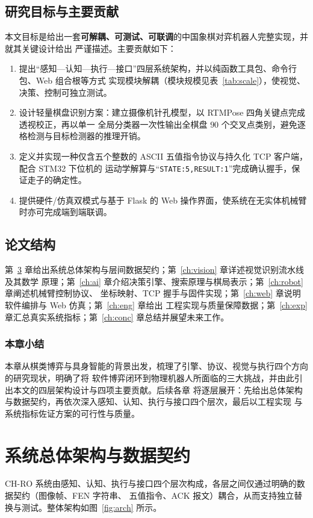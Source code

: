 \documentclass[UTF8, a4paper, 11pt, openany]{ctexbook}
\renewcommand{\_}{\textunderscore\allowbreak}
\begin{document}
\section{研究目标与主要贡献}
本文目标是给出一套\textbf{可解耦、可测试、可联调}的中国象棋对弈机器人完整实现，并就其关键设计给出
严谨描述。主要贡献如下：
\begin{enumerate}[label=(\arabic*)]
  \item 提出“感知—认知—执行—接口”四层系统架构，并以纯函数工具包、命令行包、Web 组合根等方式
        实现模块解耦（模块规模见表~\ref{tab:scale}），使视觉、决策、控制可独立测试。
  \item 设计轻量棋盘识别方案：建立摄像机针孔模型，以 RTMPose 四角关键点完成透视校正，再以单一
        全局分类器一次性输出全棋盘 $90$ 个交叉点类别，避免逐格检测与目标检测器的推理开销。
  \item 定义并实现一种仅含五个整数的 ASCII 五值指令协议与持久化 TCP 客户端，配合 STM32 下位机的
        运动学解算与“\texttt{STATE:5,RESULT:1}”完成确认握手，保证走子的确定性。
  \item 提供硬件/仿真双模式与基于 Flask 的 Web 操作界面，使系统在无实体机械臂时亦可完成端到端联调。
\end{enumerate}

\section{论文结构}
第~\ref{ch:arch} 章给出系统总体架构与层间数据契约；第~\ref{ch:vision} 章详述视觉识别流水线及其数学
原理；第~\ref{ch:ai} 章介绍决策引擎、搜索原理与棋局表示；第~\ref{ch:robot} 章阐述机械臂控制协议、
坐标映射、TCP 握手与固件实现；第~\ref{ch:web} 章说明软件编排与 Web 仿真；第~\ref{ch:eng} 章给出
工程实现与质量保障数据；第~\ref{ch:exp} 章汇总真实系统指标；第~\ref{ch:conc} 章总结并展望未来工作。

\subsection*{本章小结}
本章从棋类博弈与具身智能的背景出发，梳理了引擎、协议、视觉与执行四个方向的研究现状，明确了将
软件博弈闭环到物理机器人所面临的三大挑战，并由此引出本文的四层架构设计与四项主要贡献。后续各章
将逐层展开：先给出总体架构与数据契约，再依次深入感知、认知、执行与接口四个层次，最后以工程实现
与系统指标佐证方案的可行性与质量。

\chapter{系统总体架构与数据契约}
\label{ch:arch}
CH-RO 系统由感知、认知、执行与接口四个层次构成，各层之间仅通过明确的数据契约（图像帧、FEN 字符串、
五值指令、ACK 报文）耦合，从而支持独立替换与测试。整体架构如图~\ref{fig:arch} 所示。
\end{document}
